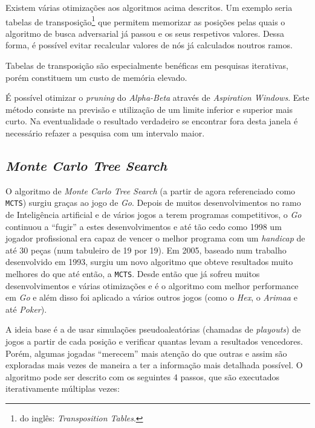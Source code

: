 \documentclass[12pt,a4paper,oneside]{article}
\begin{document}
Existem várias otimizações aos algoritmos acima descritos. Um exemplo seria tabelas de transposição\footnote{do inglês: \emph{Transposition Tables}.} que permitem memorizar as posições pelas quais o algoritmo de busca adversarial já passou e os seus respetivos valores. Dessa forma, é possível evitar recalcular valores de nós já calculados noutros ramos.

Tabelas de transposição são especialmente benéficas em pesquisas iterativas, porém constituem um custo de memória elevado.

É possível otimizar o \emph{pruning} do \emph{Alpha-Beta} através de \emph{Aspiration Windows}. Este método consiste na previsão e utilização de um limite inferior e superior mais curto. Na eventualidade o resultado verdadeiro se encontrar fora desta janela é necessário refazer a pesquisa com um intervalo maior.



\newpage

\subsection{\textit{Monte Carlo Tree Search}}
\label{ssec:mcts}

O algoritmo de \textit{Monte Carlo Tree Search} (a partir de agora
referenciado como \texttt{MCTS}) surgiu graças ao jogo de
\textit{Go}. Depois de muitos desenvolvimentos no ramo de Inteligência
artificial e de vários jogos a terem programas competitivos, o
\textit{Go} continuou a ``fugir'' a estes desenvolvimentos e até tão
cedo como 1998 um jogador profissional era capaz de vencer o melhor
programa com um \textit{handicap} de até 30 peças (num tabuleiro de 19
por 19).  Em 2005, baseado num trabalho desenvolvido em
1993\cite{Brugmann:1993}, surgiu um novo algoritmo que obteve
resultados muito melhores do que até então, a \texttt{MCTS}. Desde
então que já sofreu muitos desenvolvimentos e várias otimizações e é o
algoritmo com melhor performance em \textit{Go} e além disso foi
aplicado a vários outros jogos (como o \textit{Hex}, o \textit{Arimaa}
e até \textit{Poker}).

A ideia base é a de usar simulações pseudoaleatórias (chamadas de
\textit{playouts}) de jogos a partir de cada posição e verificar
quantas levam a resultados vencedores. Porém, algumas jogadas
``merecem'' mais atenção do que outras e assim são exploradas mais
vezes de maneira a ter a informação mais detalhada possível. O
algoritmo pode ser descrito com os seguintes 4 passos, que são
executados iterativamente múltiplas vezes:
\end{document}
